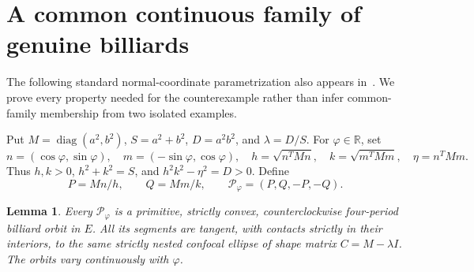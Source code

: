 \documentclass[11pt]{article}
\newtheorem{lemma}{Lemma}
\newcommand{\RR}{\mathbb R}
\begin{document}
\section{A common continuous family of genuine billiards}
The following standard normal-coordinate parametrization also appears in~\cite{ferudun}. We prove every property needed for the counterexample rather than infer common-family membership from two isolated examples.

Put \(M=\operatorname{diag}(a^2,b^2)\), \(S=a^2+b^2\), \(D=a^2b^2\), and \(\lambda=D/S\). For \(\varphi\in\RR\), set
\[
 n=(\cos\varphi,\sin\varphi),\quad m=(-\sin\varphi,\cos\varphi),\quad
 h=\sqrt{n^TMn},\quad k=\sqrt{m^TMm},\quad \eta=n^TMm.
\]
Thus \(h,k>0\), \(h^2+k^2=S\), and \(h^2k^2-\eta^2=D>0\).
Define
\[
 P=Mn/h,\qquad Q=Mm/k,\qquad \mathcal P_\varphi=(P,Q,-P,-Q).
\]
\begin{lemma}\label{family}
Every \(\mathcal P_\varphi\) is a primitive, strictly convex, counterclockwise four-period billiard orbit in \(E\). All its segments are tangent, with contacts strictly in their interiors, to the same strictly nested confocal ellipse of shape matrix \(C=M-\lambda I\). The orbits vary continuously with \(\varphi\).
\end{lemma}
\end{document}
